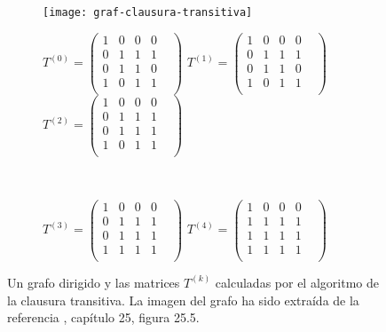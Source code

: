 \begin{figure}[htb]
	\centering
	\begin{subfigure}{\linewidth}
		\texttt{[image: graf-clausura-transitiva]}
	\end{subfigure}
	
	\begin{subfigure}{\linewidth}
		$T^{(0)}=\begin{pmatrix}
			1 & 0 & 0 & 0 &\\
			0 & 1 & 1 & 1 \\
			0 & 1 & 1 & 0 \\
			1 & 0 & 1 & 1 \\
		\end{pmatrix}$
		$T^{(1)}=\begin{pmatrix}
			1 & 0 & 0 & 0 &\\
			0 & 1 & 1 & 1 \\
			0 & 1 & 1 & 0 \\
			1 & 0 & 1 & 1 \\
		\end{pmatrix}$
		$T^{(2)}=\begin{pmatrix}
			1 & 0 & 0 & 0 &\\
			0 & 1 & 1 & 1 \\
			0 & 1 & 1 & 1 \\
			1 & 0 & 1 & 1 \\
		\end{pmatrix}$
	\end{subfigure} \\
	\vspace{0.5cm}
	\begin{subfigure}{\linewidth}
		$T^{(3)}=\begin{pmatrix}
			1 & 0 & 0 & 0 &\\
			0 & 1 & 1 & 1 \\
			0 & 1 & 1 & 1 \\
			1 & 1 & 1 & 1 \\
		\end{pmatrix}$
		$T^{(4)}=\begin{pmatrix}
			1 & 0 & 0 & 0 &\\
			1 & 1 & 1 & 1 \\
			1 & 1 & 1 & 1 \\
			1 & 1 & 1 & 1 \\
		\end{pmatrix}$
	\end{subfigure}
	\caption{Un grafo dirigido y las matrices $T^{(k)}$ calculadas por el algoritmo de la clausura transitiva. La imagen del grafo ha sido extraída de la referencia \cite{algorithms}, capítulo 25, figura 25.5.}
	\label{fig:claus-trans}
\end{figure}

